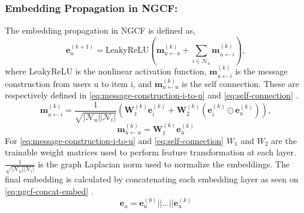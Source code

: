 \subsubsection{Embedding Propagation in NGCF:}
The embedding propagation in NGCF is defined as,
\begin{equation}
    \mathbf{e}_{u}^{(k+1)} = \mbox{LeakyReLU}(\mathbf{m}^{(k)}_{u \leftarrow u} + \sum^{}_{i \in \mathcal{N}_u} \mathbf{m}^{(k)}_{u \leftarrow i}),
    \label{eq:ngcf-embedding-propagation}
\end{equation}
where LeakyReLU is the nonlinear activation function, $\mathbf{m}^{(k)}_{u \leftarrow i}$ is the message construction from users u to item i, and $\mathbf{m}^{(k)}_{u \leftarrow u}$ is the self connection.
These are respectively defined in \autoref{eq:message-construction-i-to-u} and \autoref{eq:self-connection} \cite{NGCF_2019}.
\begin{equation}
    \mathbf{m}^{(k)}_{u \leftarrow i} = \frac{1}{\sqrt{|\mathcal{N}_u||\mathcal{N}_i|}}(\mathbf{W}^{(k)}_1\mathbf{e}^{(k)}_i + \mathbf{W}^{(k)}_2(\mathbf{e}^{(k)}_i \odot \mathbf{e}^{(k)}_u)),
    \label{eq:message-construction-i-to-u}
\end{equation}
\begin{equation}
    \mathbf{m}^{(k)}_{u \leftarrow u} = \mathbf{W}_1^{(k)}\mathbf{e}_u^{(k)}
    \label{eq:self-connection}
\end{equation}
For \autoref{eq:message-construction-i-to-u} and \autoref{eq:self-connection} $W_1$ and $W_2$ are the trainable weight matrices used to perform feature transformation at each layer.
$\frac{1}{\sqrt{|\mathcal{N}_u||\mathcal{N}_i|}}$ is the graph Laplacian norm used to normalize the embeddings.
The final embedding is calculated by concatenating each embedding layer as seen on \autoref{eq:ngcf-concat-embed} \cite{NGCF_2019}.
\begin{equation}
    \mathbf{e}_u = \mathbf{e}_u^{(0)}||...||\mathbf{e}_u^{(k)}
    \label{eq:ngcf-concat-embed}
\end{equation}

